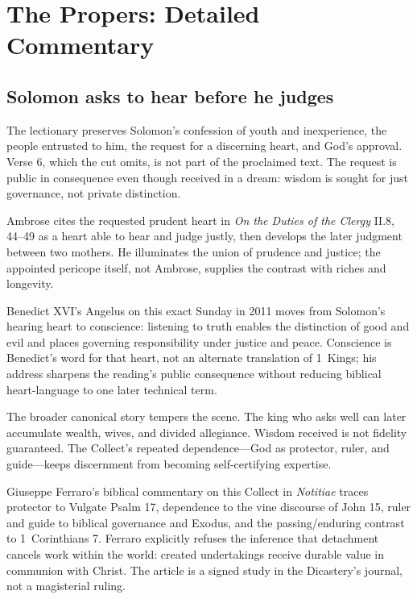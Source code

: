 \section*{The Propers: Detailed Commentary}

\subsection*{Solomon asks to hear before he judges\enspace{}}

The lectionary preserves Solomon's confession of youth and inexperience, the people entrusted to him, the request for a discerning heart, and God's approval. Verse 6, which the cut omits, is not part of the proclaimed text. The request is public in consequence even though received in a dream: wisdom is sought for just governance, not private distinction.

Ambrose cites the requested prudent heart in \emph{On the Duties of the Clergy} II.8, 44--49 as a heart able to hear and judge justly, then develops the later judgment between two mothers. He illuminates the union of prudence and justice; the appointed pericope itself, not Ambrose, supplies the contrast with riches and longevity.

Benedict XVI's Angelus on this exact Sunday in 2011 moves from Solomon's hearing heart to conscience: listening to truth enables the distinction of good and evil and places governing responsibility under justice and peace. Conscience is Benedict's word for that heart, not an alternate translation of 1~Kings; his address sharpens the reading's public consequence without reducing biblical heart-language to one later technical term.

The broader canonical story tempers the scene. The king who asks well can later accumulate wealth, wives, and divided allegiance. Wisdom received is not fidelity guaranteed. The Collect's repeated dependence---God as protector, ruler, and guide---keeps discernment from becoming self-certifying expertise.

Giuseppe Ferraro's biblical commentary on this Collect in \emph{Notitiae} traces protector to Vulgate Psalm 17, dependence to the vine discourse of John 15, ruler and guide to biblical governance and Exodus, and the passing/enduring contrast to 1~Corinthians 7. Ferraro explicitly refuses the inference that detachment cancels work within the world: created undertakings receive durable value in communion with Christ. The article is a signed study in the Dicastery's journal, not a magisterial ruling.

